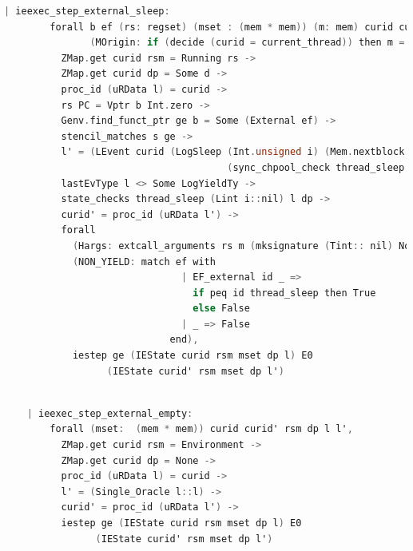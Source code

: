 \begin{lstlisting}[language=C]
    | ieexec_step_external_sleep:
        forall b ef (rs: regset) (mset : (mem * mem)) (m: mem) curid curid' rsm s l l' dp d i
               (MOrigin: if (decide (curid = current_thread)) then m = fst mset else m = snd mset),
          ZMap.get curid rsm = Running rs ->
          ZMap.get curid dp = Some d ->
          proc_id (uRData l) = curid ->
          rs PC = Vptr b Int.zero ->
          Genv.find_funct_ptr ge b = Some (External ef) ->
          stencil_matches s ge ->
          l' = (LEvent curid (LogSleep (Int.unsigned i) (Mem.nextblock m)
                                       (sync_chpool_check thread_sleep ((Lint i)::nil) (uRData l) d))::l) ->
          lastEvType l <> Some LogYieldTy ->
          state_checks thread_sleep (Lint i::nil) l dp ->
          curid' = proc_id (uRData l') ->
          forall
            (Hargs: extcall_arguments rs m (mksignature (Tint:: nil) None cc_default) (Vint i:: nil))
            (NON_YIELD: match ef with
                               | EF_external id _ => 
                                 if peq id thread_sleep then True
                                 else False
                               | _ => False
                             end),
            iestep ge (IEState curid rsm mset dp l) E0
                  (IEState curid' rsm mset dp l')
\end{lstlisting}

\begin{lstlisting}[language=C]

    | ieexec_step_external_empty:
        forall (mset:  (mem * mem)) curid curid' rsm dp l l',
          ZMap.get curid rsm = Environment ->
          ZMap.get curid dp = None ->
          proc_id (uRData l) = curid ->
          l' = (Single_Oracle l::l) ->
          curid' = proc_id (uRData l') ->
          iestep ge (IEState curid rsm mset dp l) E0
                (IEState curid' rsm mset dp l')
\end{lstlisting}


